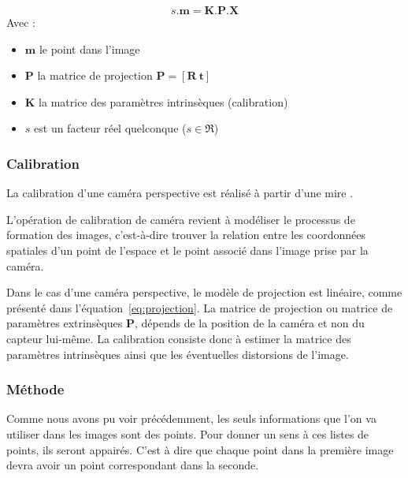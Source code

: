 \begin{equation}
s.\mathbf{m} = \mathbf{K}.\mathbf{P}.\mathbf{X}
\end{equation}
Avec : 
\begin{itemize}
\item $\mathbf{m}$ le point dans l'image
\item $\mathbf{P}$ la matrice de projection 
$\mathbf{P} = [ \mathbf{R} ~ \mathbf{t} ]$
\item $\mathbf{K}$ la matrice des paramètres intrinsèques (calibration)
\item $s$ est un facteur réel quelconque ($s \in \Re$)
\end{itemize}

\subsubsection{Calibration}
\label{subsub:calibration}
La calibration d'une caméra perspective est réalisé à partir d'une mire \cite{??}.

L'opération de calibration de caméra revient à modéliser le processus de formation des images, c'est-à-dire trouver la relation entre les coordonnées spatiales d'un point de l'espace et le point associé dans l'image prise par la caméra.

Dans le cas d'une caméra perspective, le modèle de projection est linéaire, comme présenté dans l'équation~\ref{eq:projection}.
La matrice de projection ou matrice de paramètres extrinsèques $\mathbf{P}$, dépends de la position de la caméra et non du capteur lui-même.
La calibration consiste donc à estimer la matrice des paramètres intrinsèques ainsi que les éventuelles distorsions de l'image.


\subsubsection{Méthode}

Comme nous avons pu voir précédemment, les seuls informations que l'on va utiliser dans les images sont des points.
Pour donner un sens à ces listes de points, ils seront appairés.
C'est à dire que chaque point dans la première image devra avoir un point correspondant dans la seconde.

